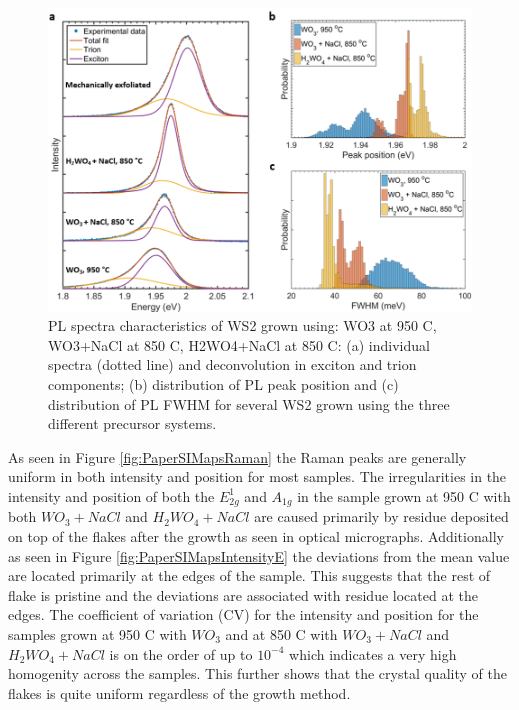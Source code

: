 \begin{figure}[h]
\begin{center}
\includegraphics[scale=0.3]{PaperPLSpectraHistograms.png}
\caption{PL spectra characteristics of WS2 grown using: WO3 at 950 {\degree}C, WO3+NaCl at 850 {\degree}C, H2WO4+NaCl at 850 {\degree}C: (a) individual spectra (dotted line) and deconvolution in exciton and trion components; (b) distribution of PL peak position and (c) distribution of PL FWHM for several WS2 grown using the three different precursor systems.}
\label{fig:PaperPLSpectraHistograms}
\end{center}
\end{figure}


As seen in Figure \ref{fig:PaperSIMapsRaman} the Raman peaks are generally uniform in both intensity and position for most samples. The irregularities in the intensity and position of both the $E^1_{2g}$ and $A_{1g}$ in the sample grown at 950 {\degree}C with both $WO_3 + NaCl$ and $H_2WO_4 + NaCl$ are caused primarily by residue deposited on top of the flakes after the growth as seen in optical micrographs. Additionally as seen in Figure \ref{fig:PaperSIMapsIntensityE} the deviations from the mean value are located primarily at the edges of the sample. This suggests that the rest of flake is pristine and the deviations are associated with residue located at the edges. The coefficient of variation (CV) for the intensity and position for the samples grown at 950 {\degree}C with $WO_3$ and at 850 {\degree}C with $WO_3 + NaCl$ and $H_2WO_4 + NaCl$ is on the order of up to $10^{-4}$ which indicates a very high homogenity across the samples. This further shows that the crystal quality of the flakes is quite uniform regardless of the growth method.

